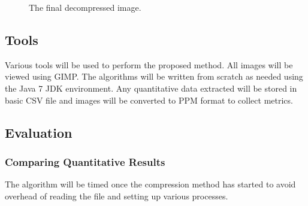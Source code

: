 \documentclass[12pt]{article}
\begin{document}
\begin{figure}[!htbp]
\begin{center}
\caption{The final decompressed image.}
\end{center}
\end{figure}

\subsection{Tools}
Various tools will be used to perform the proposed method. All images will be viewed using GIMP. The algorithms will be written from scratch as needed using the Java 7 JDK environment. Any quantitative data extracted will be stored in basic CSV file and images will be converted to PPM format to collect metrics.

\subsection{Evaluation}
\subsubsection{Comparing Quantitative Results}
The algorithm will be timed once the compression method has started to avoid overhead of reading the file and setting up various processes.
\end{document}
